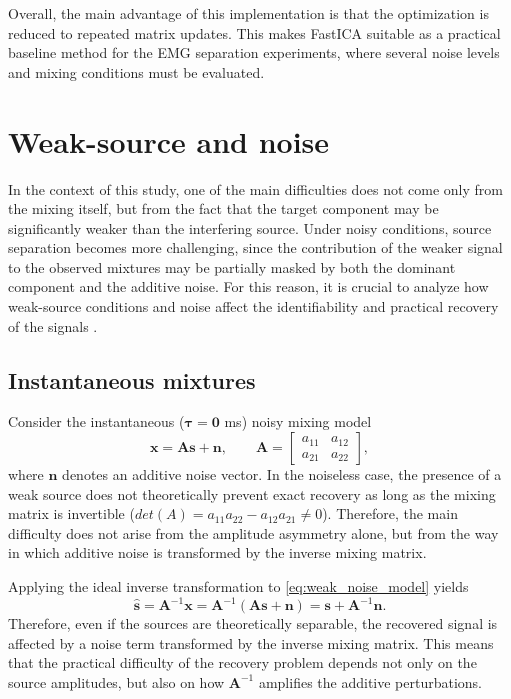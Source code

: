 Overall, the main advantage of this implementation is that the optimization is reduced to repeated matrix updates. This makes FastICA suitable as a practical baseline method for the EMG separation experiments, where several noise levels and mixing conditions must be evaluated.
\clearpage

\section{Weak-source and noise}
\label{sec:weak_source_and_noise}

In the context of this study, one of the main difficulties does not come only from the mixing itself, but from the fact that the target component may be significantly weaker than the interfering source. Under noisy conditions, source separation becomes more challenging, since the contribution of the weaker signal to the observed mixtures may be partially masked by both the dominant component and the additive noise. For this reason, it is crucial to analyze how weak-source conditions and noise affect the identifiability and practical recovery of the signals \cite{naik_blind_2014}.
\subsection{Instantaneous mixtures}
Consider the instantaneous ($\mathbf{\tau=0}$ ms) noisy mixing model
\begin{equation}
\mathbf{x}=\mathbf{A}\mathbf{s}+\mathbf{n},
\qquad
\mathbf{A}=
\begin{bmatrix}
a_{11} & a_{12}\\
a_{21} & a_{22}
\end{bmatrix},
\label{eq:weak_noise_model}
\end{equation}
where $\mathbf{n}$ denotes an additive noise vector. In the noiseless case, the presence of a weak source does not theoretically prevent exact recovery as long as the mixing matrix is invertible ($det(A)=a_{11}a_{22}-a_{12}a_{21} \neq0$). Therefore, the main difficulty does not arise from the amplitude asymmetry alone, but from the way in which additive noise is transformed by the inverse mixing matrix.

Applying the ideal inverse transformation to \eqref{eq:weak_noise_model} yields
\begin{equation}
\hat{\mathbf{s}}=\mathbf{A}^{-1}\mathbf{x}
=\mathbf{A}^{-1}(\mathbf{A}\mathbf{s}+\mathbf{n})
=\mathbf{s}+\mathbf{A}^{-1}\mathbf{n}.
\label{eq:inverse_noise_general}
\end{equation}
Therefore, even if the sources are theoretically separable, the recovered signal is affected by a noise term transformed by the inverse mixing matrix. This means that the practical difficulty of the recovery problem depends not only on the source amplitudes, but also on how $\mathbf{A}^{-1}$ amplifies the additive perturbations.


